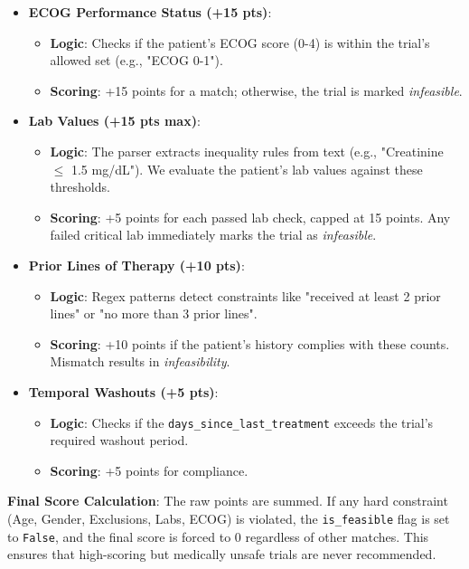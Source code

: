 \documentclass[11pt]{article}
\begin{document}
\begin{itemize}
\begin{itemize}
\end{itemize}
\item \textbf{ECOG Performance Status (+15 pts)}:
\begin{itemize}
\item \textbf{Logic}: Checks if the patient's ECOG score (0-4) is within the trial's allowed set (e.g., "ECOG 0-1").
\item \textbf{Scoring}: +15 points for a match; otherwise, the trial is marked \textit{infeasible}.
\end{itemize}
\item \textbf{Lab Values (+15 pts max)}:
\begin{itemize}
\item \textbf{Logic}: The parser extracts inequality rules from text (e.g., "Creatinine $\le$ 1.5 mg/dL"). We evaluate the patient's lab values against these thresholds.
\item \textbf{Scoring}: +5 points for each passed lab check, capped at 15 points. Any failed critical lab immediately marks the trial as \textit{infeasible}.
\end{itemize}
\item \textbf{Prior Lines of Therapy (+10 pts)}:
\begin{itemize}
\item \textbf{Logic}: Regex patterns detect constraints like "received at least 2 prior lines" or "no more than 3 prior lines".
\item \textbf{Scoring}: +10 points if the patient's history complies with these counts. Mismatch results in \textit{infeasibility}.
\end{itemize}
\item \textbf{Temporal Washouts (+5 pts)}:
\begin{itemize}
\item \textbf{Logic}: Checks if the \texttt{days\_since\_last\_treatment} exceeds the trial's required washout period.
\item \textbf{Scoring}: +5 points for compliance.
\end{itemize}
\end{itemize}
\textbf{Final Score Calculation}:
The raw points are summed. If any hard constraint (Age, Gender, Exclusions, Labs, ECOG) is violated, the \texttt{is\_feasible} flag is set to \texttt{False}, and the final score is forced to 0 regardless of other matches. This ensures that high-scoring but medically unsafe trials are never recommended.
\end{document}
